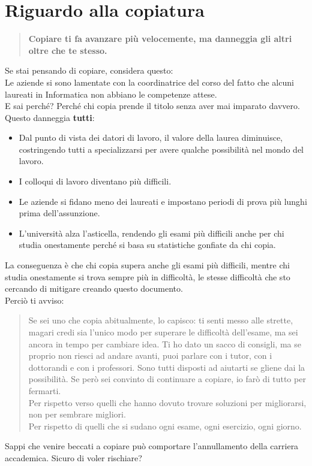 \documentclass[18pt]{extarticle}
\begin{document}
\section{Riguardo alla copiatura}
\begin{quote}
\textbf{Copiare ti fa avanzare più velocemente, ma danneggia gli altri oltre che te stesso.}
\end{quote}
Se stai pensando di copiare, considera questo:\\
Le aziende si sono lamentate con la coordinatrice del corso del fatto che alcuni laureati in Informatica non abbiano le competenze attese.\\
E sai perché? Perché chi copia prende il titolo senza aver mai imparato davvero.\\
Questo danneggia \textbf{tutti}:
\begin{itemize}
\item Dal punto di vista dei datori di lavoro, il valore della laurea diminuisce, costringendo tutti a specializzarsi per avere qualche possibilità nel mondo del lavoro.
\item I colloqui di lavoro diventano più difficili.
\item Le aziende si fidano meno dei laureati e impostano periodi di prova più lunghi prima dell'assunzione.
\item L'università alza l'asticella, rendendo gli esami più difficili anche per chi studia onestamente perché si basa su statistiche gonfiate da chi copia.
\end{itemize}
La conseguenza è che chi copia supera anche gli esami più difficili, mentre chi studia onestamente si trova sempre più in difficoltà, le stesse difficoltà che sto cercando di mitigare creando questo documento.\\
Perciò ti avviso:
\begin{quote}
Se sei uno che copia abitualmente, lo capisco: ti senti messo alle strette, magari credi sia l'unico modo per superare le difficoltà dell'esame, ma sei ancora in tempo per cambiare idea. Ti ho dato un sacco di consigli, ma se proprio non riesci ad andare avanti, puoi parlare con i tutor, con i dottorandi e con i professori. Sono tutti disposti ad aiutarti se gliene dai la possibilità. Se però sei convinto di continuare a copiare, io farò di tutto per fermarti.\\
Per rispetto verso quelli che hanno dovuto trovare soluzioni per migliorarsi, non per sembrare migliori.\\
Per rispetto di quelli che si sudano ogni esame, ogni esercizio, ogni giorno.
\end{quote}
Sappi che venire beccati a copiare può comportare l'annullamento della carriera accademica. Sicuro di voler rischiare?\\
\end{document}
